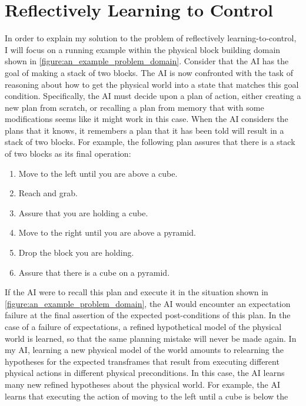 \chapter{Reflectively Learning to Control}
\label{chapter:reflectively_learning_to_control}

In order to explain my solution to the problem of reflectively
learning-to-control, I will focus on a running example within the
physical block building domain shown in
\autoref{figure:an_example_problem_domain}.  Consider that the AI has
the goal of making a stack of two blocks.  The AI is now confronted
with the task of reasoning about how to get the physical world into a
state that matches this goal condition.  Specifically, the AI must
decide upon a plan of action, either creating a new plan from scratch,
or recalling a plan from memory that with some modifications seems
like it might work in this case.  When the AI considers the plans that
it knows, it remembers a plan that it has been told will result in a
stack of two blocks.  For example, the following plan assures that
there is a stack of two blocks as its final operation:
\begin{enumerate}
\item Move to the left until you are above a cube.
\item Reach and grab.
\item Assure that you are holding a cube.
\item Move to the right until you are above a pyramid.
\item Drop the block you are holding.
\item Assure that there is a cube on a pyramid.
\end{enumerate}
If the AI were to recall this plan and execute it in the situation
shown in \autoref{figure:an_example_problem_domain}, the AI would
encounter an expectation failure at the final assertion of the
expected post-conditions of this plan.  In the case of a failure of
expectations, a refined hypothetical model of the physical world is
learned, so that the same planning mistake will never be made again.
In my AI, learning a new physical model of the world amounts to
relearning the hypotheses for the expected transframes that result
from executing different physical actions in different physical
preconditions.  In this case, the AI learns many new refined
hypotheses about the physical world.  For example, the AI learns that
executing the action of moving to the left until a cube is below the
